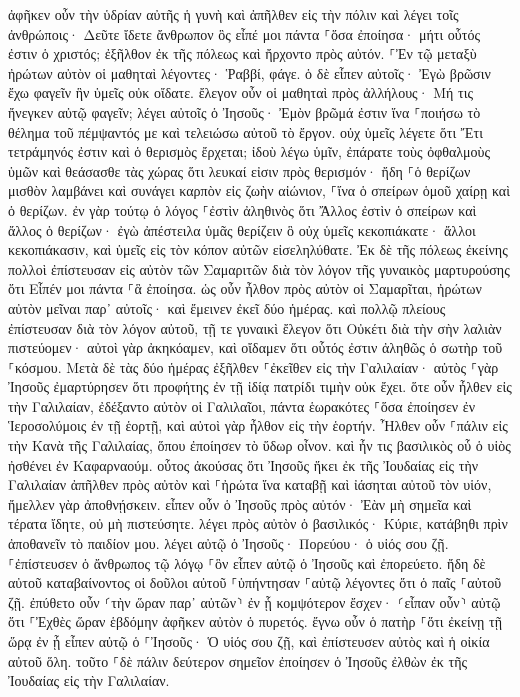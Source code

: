 \documentclass[twoside, 9pt]{extreport}
\begin{document}
ἀφῆκεν οὖν τὴν ὑδρίαν αὐτῆς ἡ γυνὴ καὶ ἀπῆλθεν εἰς τὴν πόλιν καὶ λέγει τοῖς ἀνθρώποις· 
Δεῦτε ἴδετε ἄνθρωπον ὃς εἶπέ μοι πάντα ⸀ὅσα ἐποίησα· μήτι οὗτός ἐστιν ὁ χριστός; 
ἐξῆλθον ἐκ τῆς πόλεως καὶ ἤρχοντο πρὸς αὐτόν. 
⸀Ἐν τῷ μεταξὺ ἠρώτων αὐτὸν οἱ μαθηταὶ λέγοντες· Ῥαββί, φάγε. 
ὁ δὲ εἶπεν αὐτοῖς· Ἐγὼ βρῶσιν ἔχω φαγεῖν ἣν ὑμεῖς οὐκ οἴδατε. 
ἔλεγον οὖν οἱ μαθηταὶ πρὸς ἀλλήλους· Μή τις ἤνεγκεν αὐτῷ φαγεῖν; 
λέγει αὐτοῖς ὁ Ἰησοῦς· Ἐμὸν βρῶμά ἐστιν ἵνα ⸀ποιήσω τὸ θέλημα τοῦ πέμψαντός με καὶ τελειώσω αὐτοῦ τὸ ἔργον. 
οὐχ ὑμεῖς λέγετε ὅτι Ἔτι τετράμηνός ἐστιν καὶ ὁ θερισμὸς ἔρχεται; ἰδοὺ λέγω ὑμῖν, ἐπάρατε τοὺς ὀφθαλμοὺς ὑμῶν καὶ θεάσασθε τὰς χώρας ὅτι λευκαί εἰσιν πρὸς θερισμόν· ἤδη 
⸀ὁ θερίζων μισθὸν λαμβάνει καὶ συνάγει καρπὸν εἰς ζωὴν αἰώνιον, ⸀ἵνα ὁ σπείρων ὁμοῦ χαίρῃ καὶ ὁ θερίζων. 
ἐν γὰρ τούτῳ ὁ λόγος ⸀ἐστὶν ἀληθινὸς ὅτι Ἄλλος ἐστὶν ὁ σπείρων καὶ ἄλλος ὁ θερίζων· 
ἐγὼ ἀπέστειλα ὑμᾶς θερίζειν ὃ οὐχ ὑμεῖς κεκοπιάκατε· ἄλλοι κεκοπιάκασιν, καὶ ὑμεῖς εἰς τὸν κόπον αὐτῶν εἰσεληλύθατε. 
Ἐκ δὲ τῆς πόλεως ἐκείνης πολλοὶ ἐπίστευσαν εἰς αὐτὸν τῶν Σαμαριτῶν διὰ τὸν λόγον τῆς γυναικὸς μαρτυρούσης ὅτι Εἶπέν μοι πάντα ⸀ἃ ἐποίησα. 
ὡς οὖν ἦλθον πρὸς αὐτὸν οἱ Σαμαρῖται, ἠρώτων αὐτὸν μεῖναι παρ᾽ αὐτοῖς· καὶ ἔμεινεν ἐκεῖ δύο ἡμέρας. 
καὶ πολλῷ πλείους ἐπίστευσαν διὰ τὸν λόγον αὐτοῦ, 
τῇ τε γυναικὶ ἔλεγον ὅτι Οὐκέτι διὰ τὴν σὴν λαλιὰν πιστεύομεν· αὐτοὶ γὰρ ἀκηκόαμεν, καὶ οἴδαμεν ὅτι οὗτός ἐστιν ἀληθῶς ὁ σωτὴρ τοῦ ⸀κόσμου. 
Μετὰ δὲ τὰς δύο ἡμέρας ἐξῆλθεν ⸀ἐκεῖθεν εἰς τὴν Γαλιλαίαν· 
αὐτὸς ⸀γὰρ Ἰησοῦς ἐμαρτύρησεν ὅτι προφήτης ἐν τῇ ἰδίᾳ πατρίδι τιμὴν οὐκ ἔχει. 
ὅτε οὖν ἦλθεν εἰς τὴν Γαλιλαίαν, ἐδέξαντο αὐτὸν οἱ Γαλιλαῖοι, πάντα ἑωρακότες ⸀ὅσα ἐποίησεν ἐν Ἱεροσολύμοις ἐν τῇ ἑορτῇ, καὶ αὐτοὶ γὰρ ἦλθον εἰς τὴν ἑορτήν. 
Ἦλθεν οὖν ⸀πάλιν εἰς τὴν Κανὰ τῆς Γαλιλαίας, ὅπου ἐποίησεν τὸ ὕδωρ οἶνον. καὶ ἦν τις βασιλικὸς οὗ ὁ υἱὸς ἠσθένει ἐν Καφαρναούμ. 
οὗτος ἀκούσας ὅτι Ἰησοῦς ἥκει ἐκ τῆς Ἰουδαίας εἰς τὴν Γαλιλαίαν ἀπῆλθεν πρὸς αὐτὸν καὶ ⸀ἠρώτα ἵνα καταβῇ καὶ ἰάσηται αὐτοῦ τὸν υἱόν, ἤμελλεν γὰρ ἀποθνῄσκειν. 
εἶπεν οὖν ὁ Ἰησοῦς πρὸς αὐτόν· Ἐὰν μὴ σημεῖα καὶ τέρατα ἴδητε, οὐ μὴ πιστεύσητε. 
λέγει πρὸς αὐτὸν ὁ βασιλικός· Κύριε, κατάβηθι πρὶν ἀποθανεῖν τὸ παιδίον μου. 
λέγει αὐτῷ ὁ Ἰησοῦς· Πορεύου· ὁ υἱός σου ζῇ. ⸀ἐπίστευσεν ὁ ἄνθρωπος τῷ λόγῳ ⸀ὃν εἶπεν αὐτῷ ὁ Ἰησοῦς καὶ ἐπορεύετο. 
ἤδη δὲ αὐτοῦ καταβαίνοντος οἱ δοῦλοι αὐτοῦ ⸀ὑπήντησαν ⸀αὐτῷ λέγοντες ὅτι ὁ παῖς ⸀αὐτοῦ ζῇ. 
ἐπύθετο οὖν ⸂τὴν ὥραν παρ᾽ αὐτῶν⸃ ἐν ᾗ κομψότερον ἔσχεν· ⸂εἶπαν οὖν⸃ αὐτῷ ὅτι ⸀Ἐχθὲς ὥραν ἑβδόμην ἀφῆκεν αὐτὸν ὁ πυρετός. 
ἔγνω οὖν ὁ πατὴρ ⸀ὅτι ἐκείνῃ τῇ ὥρᾳ ἐν ᾗ εἶπεν αὐτῷ ὁ ⸀Ἰησοῦς· Ὁ υἱός σου ζῇ, καὶ ἐπίστευσεν αὐτὸς καὶ ἡ οἰκία αὐτοῦ ὅλη. 
τοῦτο ⸀δὲ πάλιν δεύτερον σημεῖον ἐποίησεν ὁ Ἰησοῦς ἐλθὼν ἐκ τῆς Ἰουδαίας εἰς τὴν Γαλιλαίαν. 
\end{document}
